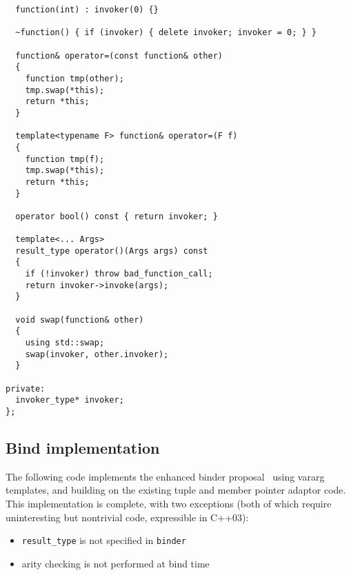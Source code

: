 \documentclass{article}
\begin{document}
\begin{verbatim}
  function(int) : invoker(0) {}
  
  ~function() { if (invoker) { delete invoker; invoker = 0; } }

  function& operator=(const function& other)
  {
    function tmp(other);
    tmp.swap(*this);
    return *this;
  }
  
  template<typename F> function& operator=(F f)
  {
    function tmp(f);
    tmp.swap(*this);
    return *this;
  }
  
  operator bool() const { return invoker; }

  template<... Args>
  result_type operator()(Args args) const
  {
    if (!invoker) throw bad_function_call;
    return invoker->invoke(args);
  }
  
  void swap(function& other)
  {
    using std::swap;
    swap(invoker, other.invoker);
  }
  
private:
  invoker_type* invoker;
};
\end{verbatim}
\normalsize

\subsection{Bind implementation}
\label{bindimpl}
The following code implements the enhanced binder
proposal~\cite{Dimov03b} using vararg templates, and building on the
existing tuple and member pointer adaptor code. This implementation is
complete, with two exceptions (both of which require uninteresting but
nontrivial code, expressible in C++03):
\begin{itemize}
  \item {\tt result\_type} is not specified in {\tt binder}
  \item arity checking is not performed at bind time
\end{itemize}
\end{document}
